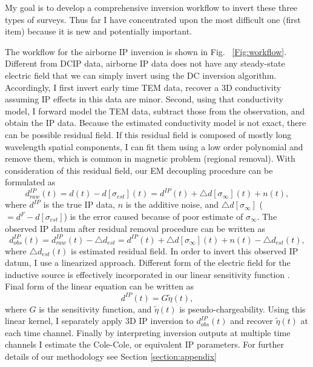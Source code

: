 \documentclass[letterpaper,11pt]{article}
\newcommand{\siginf}{\sigma_\infty}
\newcommand{\peta}{\tilde{\eta}}
\newcommand{\dip}{d^{IP}}
\begin{document}
My goal is to develop a comprehensive inversion workflow to invert  these three types of surveys. Thus far I have concentrated upon the most difficult one (first item) because it is new and potentially important. 

The workflow for the airborne IP inversion is shown in Fig. ~\ref{Fig:workflow}. Different from DCIP data, airborne IP data does not have any steady-state electric field that we can simply invert using the DC inversion algorithm. Accordingly, I first invert early time TEM data, recover a 3D conductivity assuming IP effects in this data are minor. Second, using that conductivity model, I forward model the TEM data, subtract those from the observation, and obtain the IP data. Because the estimated conductivity model is not exact, there can be possible residual field. If this residual field is composed of mostly long wavelength spatial components, I can fit them using a low order polynomial and remove them, which is common in magnetic problem (regional removal). With consideration of this residual field, our EM decoupling procedure can be formulated as 
\begin{equation}
  \dip_{raw}(t) = d(t) - d[\sigma_{est}](t) = \dip(t) + \triangle d[\siginf](t) + n(t),
  \label{eq: IPdatum_raw}
\end{equation}
where $\dip$ is the true IP data, $n$ is the additive noise, and $\triangle d[\siginf]$ ($=d^{F}-d[\sigma_{est}]$) is the error caused because of poor estimate of $\siginf$. 
The observed IP datum after residual removal procedure can be written as 
\begin{equation}
  \dip_{obs}(t) = \dip_{raw}(t) - \triangle d_{est} = \dip(t) + \triangle d[\siginf](t) + n(t) - \triangle d_{est}(t),
  \label{eq: IPdatum_obs}
\end{equation}
where $\triangle d_{est}(t)$ is estimated residual field. 
In order to invert this observed IP datum, I use a linearized approach. Different form of the electric field for the inductive source is effectively incorporated in our linear sensitivity function \cite[]{Kang2015c}. Final form of the linear equation can be written as 
\begin{equation}
  \dip(t) = G\peta(t),
  \label{eq:linearIPdatum}
\end{equation}
where $G$ is the sensitivity function, and $\peta(t)$ is pseudo-chargeability. Using this linear kernel, I separately apply 3D IP inversion to $\dip_{obs}(t)$ and recover $\peta(t)$ at each time channel. Finally by interpreting inversion outputs at multiple time channels I estimate the Cole-Cole, or equivalent IP parameters. For further details of our methodology see Section \ref{section:appendix}
\end{document}
